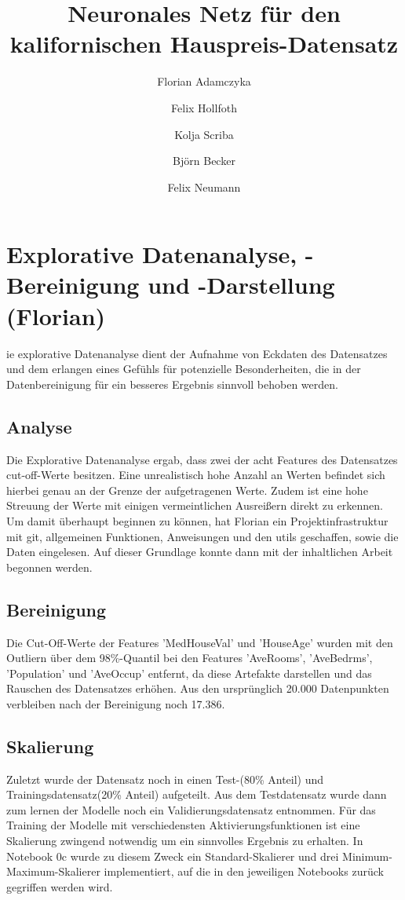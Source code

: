 \documentclass[9pt,a4paper,twocolumn,twoside]{tau-class/tau}
\title{Neuronales Netz f\"ur den kalifornischen Hauspreis-Datensatz}
\author[a]{Florian Adamczyka}%
\author[b]{Felix Hollfoth}
\author[c]{Kolja Scriba}
\author[d]{Björn Becker}
\author[e]{Felix Neumann}
\affil[a]{Justus-Liebig-Universität, Matrikelnr. 8105234}
\affil[b]{Justus Liebig Universität, Matrikelnr. 8221324}
\affil[c]{Justus Liebig Universität, Matrikelnr. 8111369}
\affil[d]{Justus Liebig Universität, Matrikelnr. 8206290}
\affil[e]{Justus Liebig Universität, Matrikelnr. 8116639}
\begin{document}
		
    \maketitle 
    \thispagestyle{firststyle}
    

\section{Explorative Datenanalyse, -Bereinigung und -Darstellung (Florian)}
ie explorative Datenanalyse dient der Aufnahme von Eckdaten des Datensatzes
und dem erlangen eines Gefühls für potenzielle Besonderheiten,
die in der Datenbereinigung für ein besseres Ergebnis sinnvoll behoben werden.
    \subsection{Analyse}
        Die Explorative Datenanalyse ergab, dass zwei der acht Features des Datensatzes cut-off-Werte besitzen.
        Eine unrealistisch hohe Anzahl an Werten befindet sich hierbei genau an der Grenze der aufgetragenen Werte. 
        Zudem ist eine hohe Streuung der Werte mit einigen vermeintlichen Ausreißern direkt zu erkennen.
        Um damit überhaupt beginnen zu können, hat Florian ein Projektinfrastruktur mit git, allgemeinen Funktionen, 
        Anweisungen und den utils geschaffen, sowie die Daten eingelesen. Auf dieser Grundlage konnte dann mit der inhaltlichen Arbeit 
        begonnen werden. 
    
    \subsection{Bereinigung}
        Die Cut-Off-Werte der Features 'MedHouseVal' und 'HouseAge'  wurden mit den Outliern über dem 98\%-Quantil
        bei den Features 'AveRooms', 'AveBedrms', 'Population' und 'AveOccup' entfernt, da diese Artefakte darstellen und das Rauschen des Datensatzes erhöhen.
        Aus den ursprünglich 20.000 Datenpunkten verbleiben nach der Bereinigung noch 17.386. 

    \subsection{Skalierung}
        Zuletzt wurde der Datensatz noch in einen Test-(80\% Anteil) und Trainingsdatensatz(20\% Anteil) aufgeteilt. 
        Aus dem Testdatensatz wurde dann zum lernen der Modelle noch ein Validierungsdatensatz entnommen.
        Für das Training der Modelle mit verschiedensten Aktivierungsfunktionen ist eine Skalierung zwingend notwendig um ein sinnvolles Ergebnis zu erhalten. 
        In Notebook 0c wurde zu diesem Zweck ein Standard-Skalierer und drei Minimum-Maximum-Skalierer
        implementiert, auf die in den jeweiligen Notebooks zurück gegriffen werden wird.
\end{document}
